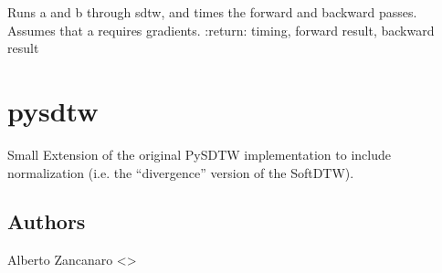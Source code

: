 \documentclass[letterpaper,10pt,english]{sphinxmanual}
\begin{document}
\begin{fulllineitems}
\label{\detokenize{dtw_loss_functions.soft_dtw_implementations.soft_dtw_cuda_mag:dtw_loss_functions.soft_dtw_implementations.soft_dtw_cuda_mag.timed_run}}
\pysigstartsignatures
\pysiglinewithargsret
{}
{\sphinxparamcomma {}\sphinxparamcomma {}}
{}
\pysigstopsignatures
\sphinxAtStartPar
Runs a and b through sdtw, and times the forward and backward passes.
Assumes that a requires gradients.
:return: timing, forward result, backward result

\end{fulllineitems}


\sphinxstepscope


\section{pysdtw}
\label{\detokenize{dtw_loss_functions.soft_dtw_implementations.pysdtw_normalize:module-dtw_loss_functions.soft_dtw_implementations.pysdtw_normalize}}\label{\detokenize{dtw_loss_functions.soft_dtw_implementations.pysdtw_normalize:pysdtw}}\label{\detokenize{dtw_loss_functions.soft_dtw_implementations.pysdtw_normalize::doc}}
\sphinxAtStartPar
Small Extension of the original PySDTW implementation to include normalization (i.e. the “divergence” version of the SoftDTW).


\subsection{Authors}
\label{\detokenize{dtw_loss_functions.soft_dtw_implementations.pysdtw_normalize:authors}}
\sphinxAtStartPar
Alberto Zancanaro \textless{}\textgreater{}
\end{document}
